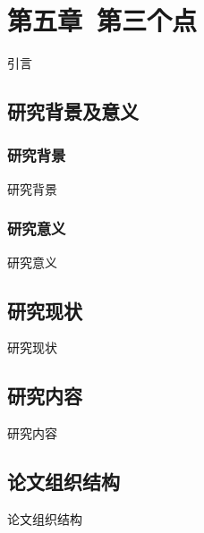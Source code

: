 \setcounter{section}{5}
\setcounter{subsection}{0}
\section*{第五章\ 第三个点}
引言
\subsection{研究背景及意义}
\subsubsection{研究背景}
研究背景
\subsubsection{研究意义}
研究意义
\subsection{研究现状}
研究现状
\subsection{研究内容}
研究内容
\subsection{论文组织结构}
论文组织结构

\pagestyle{fancy}			%
\chead{}	%

